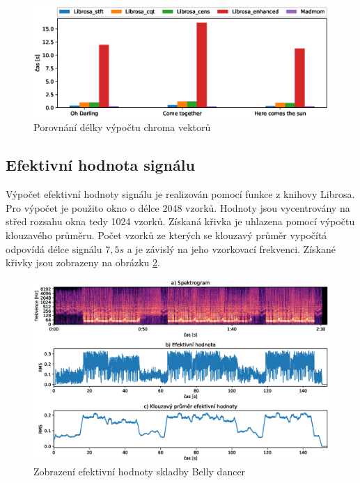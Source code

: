 \begin{figure}[H]
    \centering
    \includegraphics[width = 1\linewidth]{obrazky/Chroma_analysis_times_comparison.eps}
    \caption{Porovnání délky výpočtu chroma vektorů}
    \label{fig:Chroma_calculation_time}
\end{figure}
    
\subsection{Efektivní hodnota signálu}
Výpočet efektivní hodnoty signálu je realizován pomocí funkce z knihovy Librosa. Pro výpočet je použito okno o délce 2048 vzorků. Hodnoty jsou vycentrovány na střed rozsahu okna tedy 1024 vzorků. Získaná křivka je uhlazena pomocí výpočtu klouzavého průměru. Počet vzorků ze kterých se klouzavý průměr vypočítá odpovídá délce signálu $7,5 s$ a je závislý na jeho vzorkovací frekvenci. Získané křivky jsou zobrazeny na obrázku \ref{fig:RMS_calculation}.

\begin{figure}[H]
    \centering
    \includegraphics[width = 1\linewidth]{obrazky/Belly_dancer_RMS.eps}
    \caption{Zobrazení efektivní hodnoty skladby Belly dancer}
    \label{fig:RMS_calculation}
\end{figure}

